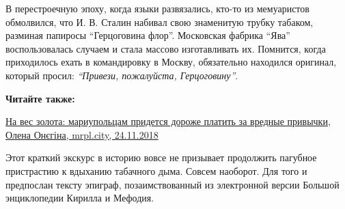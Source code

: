 
В перестроечную эпоху, когда языки развязались, кто-то из мемуаристов
обмолвился, что И. В. Сталин набивал свою знаменитую трубку табаком, разминая
папиросы \enquote{Герцоговина флор}. Московская фабрика \enquote{Ява} воспользовалась случаем и
стала массово изготавливать их. Помнится, когда приходилось ехать в
командировку в Москву, обязательно находился оригинал, который просил:
\emph{\enquote{Привези, пожалуйста, Герцоговину}}.

\textbf{Читайте также:} 

\href{https://mrpl.city/news/view/na-ves-zolota-mariupoltsam-pridetsya-dorozhe-platit-za-vrednye-privychki}{На вес золота: мариупольцам придется дороже платить за вредные привычки, Олена Онєгіна, mrpl.city, 24.11.2018}

Этот краткий экскурс в историю вовсе не призывает продолжить пагубное
пристрастию к вдыханию табачного дыма. Совсем наоборот. Для того и предпослан
тексту эпиграф, позаимствованный из электронной версии Большой энциклопедии
Кирилла и Мефодия.
